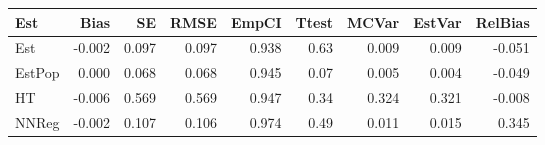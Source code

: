 
\begin{tabular}{lrrrrrrrr}
\toprule
Est & Bias & SE & RMSE & EmpCI & Ttest & MCVar & EstVar & RelBias\\
\midrule
Est & -0.002 & 0.097 & 0.097 & 0.938 & 0.63 & 0.009 & 0.009 & -0.051\\
EstPop & 0.000 & 0.068 & 0.068 & 0.945 & 0.07 & 0.005 & 0.004 & -0.049\\
HT & -0.006 & 0.569 & 0.569 & 0.947 & 0.34 & 0.324 & 0.321 & -0.008\\
NNReg & -0.002 & 0.107 & 0.106 & 0.974 & 0.49 & 0.011 & 0.015 & 0.345\\
\bottomrule
\end{tabular}